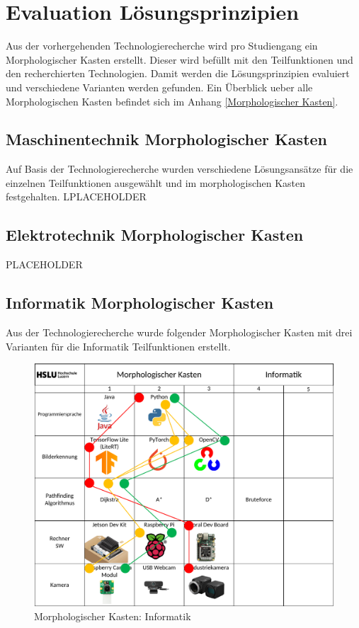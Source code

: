 \section{Evaluation Lösungsprinzipien}

Aus der vorhergehenden Technologierecherche wird pro Studiengang ein Morphologischer Kasten erstellt. Dieser wird befüllt mit den Teilfunktionen und den recherchierten Technologien. Damit werden die Lösungsprinzipien evaluiert und verschiedene Varianten werden gefunden. Ein Überblick ueber alle Morphologischen Kasten befindet sich im Anhang \ref{Morphologischer Kasten}.

\subsection{Maschinentechnik Morphologischer Kasten}

Auf Basis der Technologierecherche wurden verschiedene Lösungsansätze für die einzelnen Teilfunktionen ausgewählt und im morphologischen Kasten festgehalten. LPLACEHOLDER

\subsection{Elektrotechnik Morphologischer Kasten}

PLACEHOLDER

\subsection{Informatik Morphologischer Kasten}

Aus der Technologierecherche wurde folgender Morphologischer Kasten mit drei Varianten für die Informatik Teilfunktionen erstellt.

\begin{figure}[H]
\centering
\includegraphics[width=\textwidth]{assets/MK_Informatik.pdf}
\caption{Morphologischer Kasten: Informatik}
\label{fig:mk-informatik}
\end{figure}


